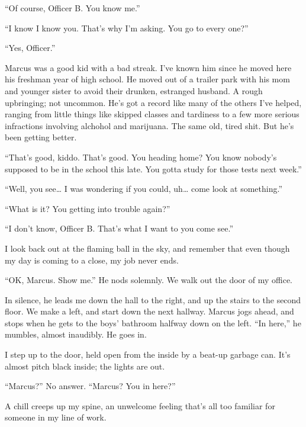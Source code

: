 ``Of course, Officer B. You know me.''

``I know I know you. That's why I'm asking. You go to every
one?''

``Yes, Officer.''



Marcus was a good kid with a bad streak. I've known him since he
moved here his freshman year of high school. He moved out of a
trailer park with his mom and younger sister to avoid their
drunken, estranged husband. A rough upbringing; not uncommon. He's
got a record like many of the others I've helped, ranging from
little things like skipped classes and tardiness to a few more
serious infractions involving alchohol and marijuana. The same old,
tired shit. But he's been getting better.



``That's good, kiddo. That's good. You heading home? You know
nobody's supposed to be in the school this late. You gotta study
for those tests next week.''

``Well, you see{\ldots} I was wondering if you could, uh{\ldots} come look at
something.''

``What is it? You getting into trouble again?''

``I don't know, Officer B. That's what I want to you come
see.''



I look back out at the flaming ball in the sky, and remember that
even though my day is coming to a close, my job never ends.



``OK, Marcus. Show me.'' He nods solemnly. We walk out the door of my
office.



In silence, he leads me down the hall to the right, and up the
stairs to the second floor. We make a left, and start down the next
hallway. Marcus jogs ahead, and stops when he gets to the boys'
bathroom halfway down on the left. ``In here,'' he mumbles, almost
inaudibly. He goes in.



I step up to the door, held open from the inside by a beat-up
garbage can. It's almost pitch black inside; the lights are
out.



``Marcus?'' No answer. ``Marcus? You in here?''



A chill creeps up my spine, an unwelcome feeling that's all too
familiar for someone in my line of work.



